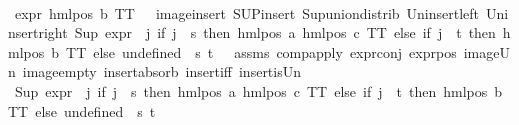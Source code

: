 \begin{isabellebody}
\ \ \ \ \ \ \ \ \isamarkupfalse%
\ {\isacartoucheopen}expr{\isacharunderscore}{\kern0pt}{}\ {\isacharparenleft}{\kern0pt}hml{\isacharunderscore}{\kern0pt}pos\ b\ TT{\isacharparenright}{\kern0pt}\ {\isacharequal}{\kern0pt}\ {}{\isacartoucheclose}\ image{\isacharunderscore}{\kern0pt}insert\ SUP{\isacharunderscore}{\kern0pt}insert\ Sup{\isacharunderscore}{\kern0pt}union{\isacharunderscore}{\kern0pt}distrib\ Un{\isacharunderscore}{\kern0pt}insert{\isacharunderscore}{\kern0pt}left\ Un{\isacharunderscore}{\kern0pt}insert{\isacharunderscore}{\kern0pt}right\ {\isacartoucheopen}Sup\ {\isacharparenleft}{\kern0pt}{\isacharparenleft}{\kern0pt}expr{\isacharunderscore}{\kern0pt}{}\ {\isasymcirc}\ {\isacharparenleft}{\kern0pt}{\isasymlambda}j{\isachardot}{\kern0pt}\ if\ j\ {\isacharequal}{\kern0pt}\ s\ then\ hml{\isacharunderscore}{\kern0pt}pos\ a\ {\isacharparenleft}{\kern0pt}hml{\isacharunderscore}{\kern0pt}pos\ c\ TT{\isacharparenright}{\kern0pt}\ else\ if\ j\ {\isacharequal}{\kern0pt}\ t\ then\ hml{\isacharunderscore}{\kern0pt}pos\ b\ TT\ else\ undefined{\isacharparenright}{\kern0pt}{\isacharparenright}{\kern0pt}\ {\isacharbackquote}{\kern0pt}\ {\isacharbraceleft}{\kern0pt}s{\isacharcomma}{\kern0pt}\ t{\isacharbraceright}{\kern0pt}{\isacharparenright}{\kern0pt}\ {\isacharequal}{\kern0pt}\ {}{\isacartoucheclose}\ assms{\isacharparenleft}{\kern0pt}{}{\isacharparenright}{\kern0pt}\ comp{\isacharunderscore}{\kern0pt}apply\ expr{\isacharunderscore}{\kern0pt}{}{\isacharunderscore}{\kern0pt}conj\ expr{\isacharunderscore}{\kern0pt}{}{\isacharunderscore}{\kern0pt}pos\ image{\isacharunderscore}{\kern0pt}Un\ image{\isacharunderscore}{\kern0pt}empty\ insert{\isacharunderscore}{\kern0pt}absorb\ insert{\isacharunderscore}{\kern0pt}iff\ insert{\isacharunderscore}{\kern0pt}is{\isacharunderscore}{\kern0pt}Un\isanewline
\ \ \ \ \ \ \ \ \isanewline
\ \ \ \ \ \ \isamarkupfalse%
\ {\isacharminus}{\kern0pt}\isanewline
\ \ \ \ \ \ \ \ \isamarkupfalse%
\ {\isachardoublequoteopen}Sup\ {\isacharparenleft}{\kern0pt}{\isacharparenleft}{\kern0pt}expr{\isacharunderscore}{\kern0pt}{}\ {\isasymcirc}\ {\isacharparenleft}{\kern0pt}{\isasymlambda}j{\isachardot}{\kern0pt}\ if\ j\ {\isacharequal}{\kern0pt}\ s\ then\ hml{\isacharunderscore}{\kern0pt}pos\ a\ {\isacharparenleft}{\kern0pt}hml{\isacharunderscore}{\kern0pt}pos\ c\ TT{\isacharparenright}{\kern0pt}\ else\ if\ j\ {\isacharequal}{\kern0pt}\ t\ then\ hml{\isacharunderscore}{\kern0pt}pos\ b\ TT\ else\ undefined{\isacharparenright}{\kern0pt}{\isacharparenright}{\kern0pt}\ {\isacharbackquote}{\kern0pt}\ {\isacharbraceleft}{\kern0pt}s{\isacharcomma}{\kern0pt}\ t{\isacharbraceright}{\kern0pt}{\isacharparenright}{\kern0pt}\ {\isacharequal}{\kern0pt}\ {}{\isachardoublequoteclose}\isanewline

\end{isabellebody}
